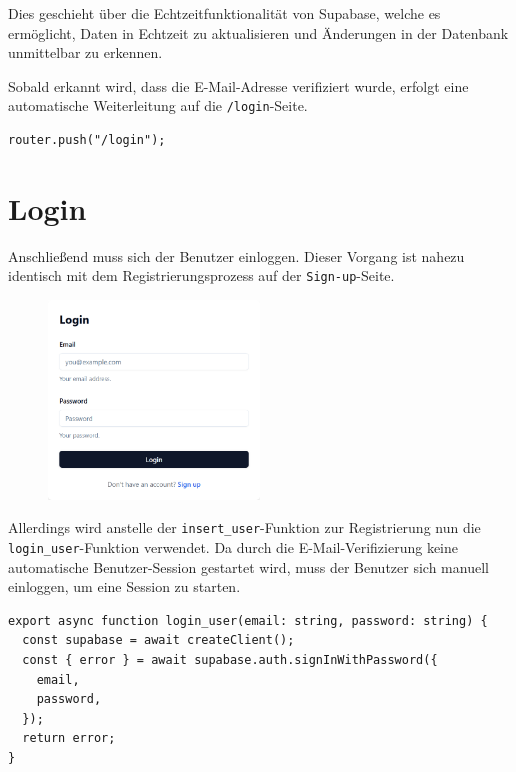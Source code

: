 \begin{inhalt}
Dies geschieht über die Echtzeitfunktionalität von Supabase, welche es ermöglicht, Daten in Echtzeit zu aktualisieren und Änderungen in der Datenbank unmittelbar zu erkennen.

Sobald erkannt wird, dass die E-Mail-Adresse verifiziert wurde, erfolgt eine automatische Weiterleitung auf die \texttt{/login}-Seite.

\begin{lstlisting}[style=mytsx]
      router.push("/login");
\end{lstlisting}     


\section{Login}
\label{ref:Login}
Anschließend muss sich der Benutzer einloggen. Dieser Vorgang ist nahezu identisch mit dem Registrierungsprozess auf der \texttt{Sign-up}-Seite. 

\begin{figure}[!htb]
\centering
\includegraphics[width=0.5\textwidth]{files/Thomas/pics/Website/Login/login.png}
\caption[Bildbezeichnung für Abbildungsverzeichnis]{}
\label{fig:gehaeuse_internet_bild}
\end{figure}


Allerdings wird anstelle der \texttt{insert\_user}-Funktion zur Registrierung nun die \texttt{login\_user}-Funktion verwendet.
Da durch die E-Mail-Verifizierung keine automatische Benutzer-Session gestartet wird, muss der Benutzer sich manuell einloggen, um eine Session zu starten.

\begin{lstlisting}[style=mytsx]
export async function login_user(email: string, password: string) {
  const supabase = await createClient();
  const { error } = await supabase.auth.signInWithPassword({
    email,
    password,
  });
  return error;
}
\end{lstlisting}


\end{inhalt}
